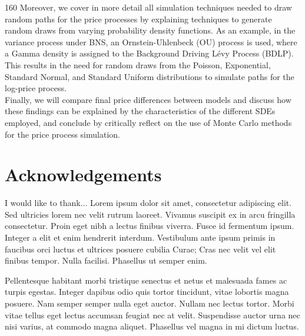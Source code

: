 \documentclass[12pt,a4paper,oneside]{report}
\begin{document}
\begin{textblock}{160}
Moreover, we cover in more detail all simulation techniques needed to draw random paths for the price processes by explaining techniques to generate random draws from varying probability density functions. As an example, in the variance process under BNS, an Ornstein-Uhlenbeck (OU) process is used, where a Gamma density is assigned to the Background Driving Lévy Process (BDLP). This results in the need for random draws from the Poisson, Exponential, Standard Normal, and Standard Uniform distributions to simulate paths for the log-price process. \\

Finally, we will compare final price differences between models and discuss how these findings can be explained by the characteristics of the different SDEs employed, and conclude by critically reflect on the use of Monte Carlo methods for the price process simulation.
\end{textblock}

\newpage
%

\setcounter{page}{0}


\chapter*{Acknowledgements}

I would like to thank...
Lorem ipsum dolor sit amet, consectetur adipiscing elit. Sed ultricies lorem nec velit rutrum laoreet. Vivamus suscipit ex in arcu fringilla consectetur. Proin eget nibh a lectus finibus viverra. Fusce id fermentum ipsum. Integer a elit et enim hendrerit interdum. Vestibulum ante ipsum primis in faucibus orci luctus et ultrices posuere cubilia Curae; Cras nec velit vel elit finibus tempor. Nulla facilisi. Phasellus ut semper enim.

Pellentesque habitant morbi tristique senectus et netus et malesuada fames ac turpis egestas. Integer dapibus odio quis tortor tincidunt, vitae lobortis magna posuere. Nam semper semper nulla eget auctor. Nullam nec lectus tortor. Morbi vitae tellus eget lectus accumsan feugiat nec at velit. Suspendisse auctor urna nec nisi varius, at commodo magna aliquet. Phasellus vel magna in mi dictum luctus.
\end{document}
